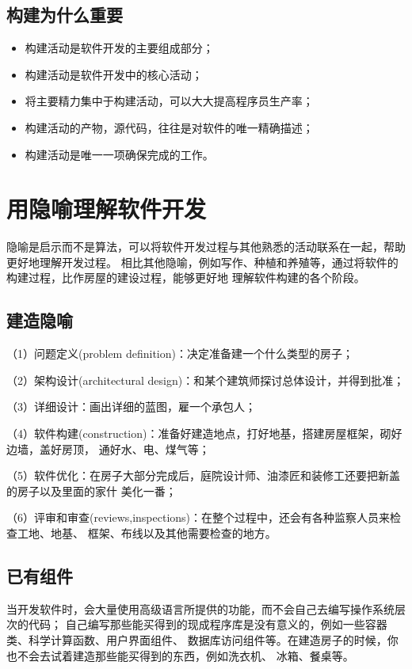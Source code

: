 \documentclass{article}
\begin{document}
\subsection{构建为什么重要}
\begin{itemize}
    \item 构建活动是软件开发的主要组成部分；
    \item 构建活动是软件开发中的核心活动；
    \item 将主要精力集中于构建活动，可以大大提高程序员生产率；
    \item 构建活动的产物，源代码，往往是对软件的唯一精确描述；
    \item 构建活动是唯一一项确保完成的工作。
\end{itemize}

\section{用隐喻理解软件开发}
隐喻是启示而不是算法，可以将软件开发过程与其他熟悉的活动联系在一起，帮助更好地理解开发过程。
相比其他隐喻，例如写作、种植和养殖等，通过将软件的构建过程，比作房屋的建设过程，能够更好地
理解软件构建的各个阶段。
\subsection{建造隐喻}
\par
（1）问题定义(problem definition)：决定准备建一个什么类型的房子；
\par
（2）架构设计(architectural design)：和某个建筑师探讨总体设计，并得到批准；
\par
（3）详细设计：画出详细的蓝图，雇一个承包人；
\par
（4）软件构建(construction)：准备好建造地点，打好地基，搭建房屋框架，砌好边墙，盖好房顶，
通好水、电、煤气等；
\par
（5）软件优化：在房子大部分完成后，庭院设计师、油漆匠和装修工还要把新盖的房子以及里面的家什
美化一番；
\par
（6）评审和审查(reviews,inspections)：在整个过程中，还会有各种监察人员来检查工地、地基、
框架、布线以及其他需要检查的地方。

\subsection{已有组件}
当开发软件时，会大量使用高级语言所提供的功能，而不会自己去编写操作系统层次的代码；
自己编写那些能买得到的现成程序库是没有意义的，例如一些容器类、科学计算函数、用户界面组件、
数据库访问组件等。在建造房子的时候，你也不会去试着建造那些能买得到的东西，例如洗衣机、
冰箱、餐桌等。
\end{document}
